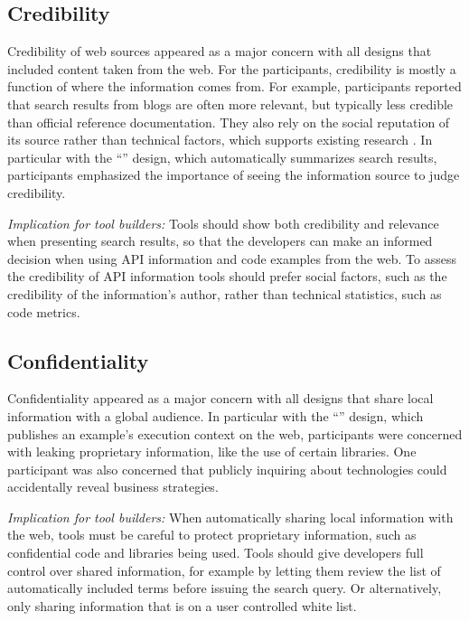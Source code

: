 \moarsauce
\subsection{Credibility}

Credibility of web sources appeared as a major concern with all designs that included content taken from the web. For the participants, credibility is mostly a function of where the information comes from. For example, participants reported that search results from blogs are often more relevant, but typically less credible than official reference documentation. They also rely on the social reputation of its source rather than technical factors, which supports existing research \cite{Gysin2010a}. In particular with the ``\FacettedSearch'' design, which automatically summarizes search results, participants emphasized the importance of seeing the information source to judge credibility.  

\emph{Implication for tool builders:} Tools should show both credibility and relevance when presenting search results, so that the developers can make an informed decision when using API information and code examples from the web. To assess the credibility of API information tools should prefer social factors, such as the credibility of the information's author, rather than technical statistics, such as code metrics.

\moarsauce
\subsection{Confidentiality}

Confidentiality appeared as a major concern with all designs that share local information with a global audience. In particular with the ``\CloudREPL'' design, which publishes an example's execution context on the web, participants were concerned with leaking proprietary information, like the use of certain libraries. One participant was also concerned that publicly inquiring about technologies could accidentally reveal business strategies.

\emph{Implication for tool builders:} When automatically sharing local information with the web, tools must be careful to protect proprietary information, such as confidential code and libraries being used. Tools should give developers full control over shared information, for example by letting them review the list of automatically included terms before issuing the search query. Or alternatively, only sharing information that is on a user controlled white list.

